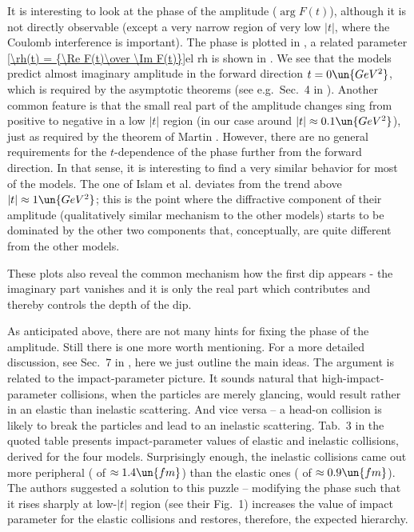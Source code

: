 It is interesting to look at the phase of the amplitude ($\arg F(t)$), although it is not directly observable (except a very narrow region of very low $|t|$, where the Coulomb interference is important). The phase is plotted in , a related parameter 
\eqref{\rh(t) = {\Re F(t)\over \Im F(t)}}{el rh}
is shown in . We see that the models predict almost imaginary amplitude in the forward direction $t=0\un{GeV^2}$, which is required by the asymptotic theorems (see e.g.~Sec.~4 in ). Another common feature is that the small real part of the amplitude changes sing from positive to negative in a low $|t|$ region (in our case around $|t| \approx 0.1\un{GeV^2}$), just as required by the theorem of Martin . However, there are no general requirements for the $t$-dependence of the phase further from the forward direction. In that sense, it is interesting to find a very similar behavior for most of the models. The one of Islam et al. deviates from the trend above $|t|\approx 1\un{GeV^2}$; this is the point where the diffractive component of their amplitude (qualitatively similar mechanism to the other models) starts to be dominated by the other two components that, conceptually, are quite different from the other models.

These plots also reveal the common mechanism how the first dip appears - the imaginary part vanishes and it is only the real part which contributes and thereby controls the depth of the dip.



As anticipated above, there are not many hints for fixing the phase of the amplitude. Still there is one more worth mentioning. For a more detailed discussion, see Sec.~7 in , here we just outline the main ideas. The argument is related to the impact-parameter picture. It sounds natural that high-impact-parameter collisions, when the particles are merely glancing, would result rather in an elastic than inelastic scattering. And vice versa -- a head-on collision is likely to break the particles and lead to an inelastic scattering. Tab.~3 in the quoted table presents  impact-parameter values of elastic and inelastic collisions, derived for the four models. Surprisingly enough, the inelastic collisions came out more peripheral ( of $\approx 1.4\un{fm}$) than the elastic ones ( of $\approx 0.9\un{fm}$). The authors suggested a solution to this puzzle -- modifying the phase such that it rises sharply at low-$|t|$ region (see their Fig.~1) increases the  value of impact parameter for the elastic collisions and restores, therefore, the expected hierarchy.

